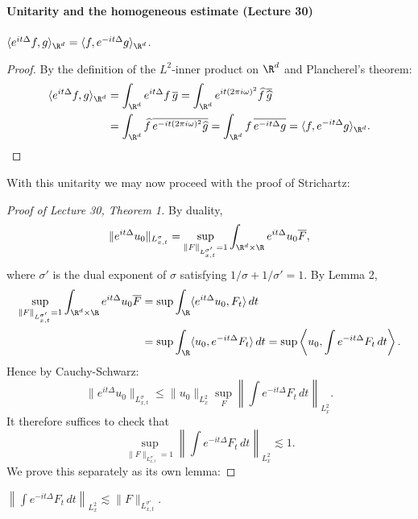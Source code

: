 \paragraph{Unitarity and the homogeneous estimate (Lecture 30)}
\begin{lemma}
$\langle e^{it\Delta}f,g\rangle_{\R^d}=\langle f,e^{-it\Delta}g\rangle_{\R^d}$.
\end{lemma}
\begin{proof}
By the definition of the $L^2$-inner product on $\R^d$ and Plancherel's theorem:
\begin{align*}
\langle e^{it\Delta}f,g\rangle_{\R^d}&=\int_{\R^d}e^{it\Delta}f\,\overline g
=\int_{\R^d}e^{it(2\pi i\omega)^2}\widehat f\,\overline{\widehat g}\\
&=\int_{\R^d}\widehat f\,\overline{e^{-it(2\pi i\omega)^2}\widehat g}
=\int_{\R^d}f\,\overline{e^{-it\Delta}g}=\langle f,e^{-it\Delta}g\rangle_{\R^d}.
\end{align*}
\end{proof}
With this unitarity we may now proceed with the proof of Strichartz:
\begin{proof}[Proof of Lecture 30, Theorem 1]
By duality,
\[\|e^{it\Delta}u_0\|_{L^\sigma_{x,t}}=\sup_{\|F\|_{L^{\sigma'}_{x,t}}=1}\int_{\R^d\times\R}e^{it\Delta}u_0\overline F,\]
where $\sigma'$ is the dual exponent of $\sigma$ satisfying $1/\sigma+1/\sigma'=1$. By Lemma 2,
\begin{align*}
\sup_{\|F\|_{L^{\sigma'}_{x,t}}=1}\int_{\R^d\times\R}e^{it\Delta}u_0\overline F
&=\sup\int_\R\langle e^{it\Delta}u_0,F_t\rangle\,dt\\
&=\sup\int_\R\langle u_0,e^{-it\Delta}F_t\rangle\,dt
=\sup\left\langle u_0,\int e^{-it\Delta}F_t\,dt\right\rangle.
\end{align*}
Hence by Cauchy-Schwarz:
\[\|e^{it\Delta}u_0\|_{L^\sigma_{x,t}}\leq\|u_0\|_{L^2_x}\sup_F\left\|\int e^{-it\Delta}F_t\,dt\right\|_{L^2_x}.\]
It therefore suffices to check that
\[\sup_{\|F\|_{L^{\sigma'}_{x,t}}=1}\left\|\int e^{-it\Delta}F_t\,dt\right\|_{L^2_x}\lesssim1.\]
We prove this separately as its own lemma:
\end{proof}
\begin{lemma}
$\left\|\int e^{-it\Delta}F_t\,dt\right\|_{L^2_x}\lesssim\|F\|_{L^{\sigma'}_{x,t}}$.
\end{lemma}
